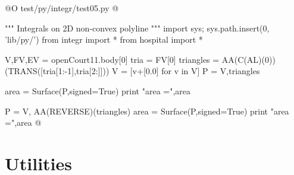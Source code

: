 \documentclass[11pt,oneside]{article}	%
\begin{document}
@O test/py/integr/test05.py
@{""" Integrals on 2D non-convex polyline """
import sys; sys.path.insert(0, 'lib/py/')
from integr import *
from hospital import *

V,FV,EV = openCourt11.body[0]
tria = FV[0]
triangles = AA(C(AL)(0))(TRANS([tria[1:-1],tria[2:]]))
V = [v+[0.0] for v in V]
P = V,triangles

area = Surface(P,signed=True)
print "area =",area

P = V, AA(REVERSE)(triangles)
area = Surface(P,signed=True)
print "area =",area
@}

   

\appendix
\section{Utilities}





\end{document}
